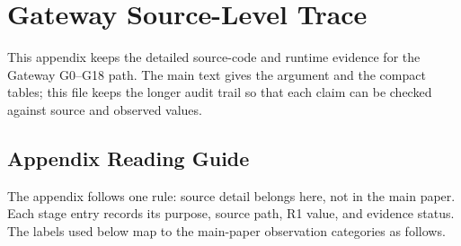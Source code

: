 
\section{Gateway Source-Level Trace}
\label{app:gateway-source-trace}

\renewcommand{\py}[1]{\lstinline|#1|}
\renewcommand{\pyI}[1]{\hspace*{1.4em}\lstinline|#1|}
\renewcommand{\pyII}[1]{\hspace*{2.8em}\lstinline|#1|}
\renewcommand{\pyIII}[1]{\hspace*{4.2em}\lstinline|#1|}
\renewcommand{\pyIIII}[1]{\hspace*{5.6em}\lstinline|#1|}
\newcommand{\pyt}[1]{{\ttfamily #1}}
\newcommand{\pytI}[1]{\hspace*{1.4em}{\ttfamily #1}}
\newcommand{\pytII}[1]{\hspace*{2.8em}{\ttfamily #1}}
\newcommand{\pytIII}[1]{\hspace*{4.2em}{\ttfamily #1}}

This appendix keeps the detailed source-code and runtime evidence for the
Gateway G0--G18 path. The main text gives the argument and the compact
tables; this file keeps the longer audit trail so that each claim can be
checked against source and observed values.

\subsection*{Appendix Reading Guide}
\label{app:reading-guide}

The appendix follows one rule: source detail belongs here, not in the main
paper. Each stage entry records its purpose, source path, R1 value, and
evidence status. The labels used below map to the main-paper observation
categories as follows.

